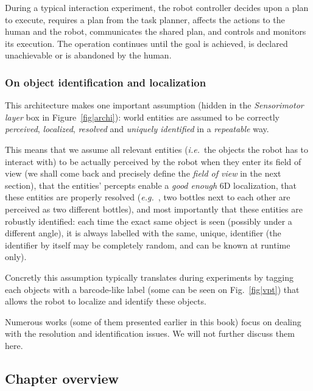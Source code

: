 \documentclass{svmult}
\newcommand{\ie}{{\textit{i.e.~}}}
\newcommand{\eg}{{\textit{e.g.~}}}
\begin{document}
During a typical interaction experiment, the robot controller decides upon a
plan to execute, requires a plan from the task planner, affects the actions to
the human and the robot, communicates the shared plan, and controls and
monitors its execution. The operation continues until the goal is achieved, is
declared unachievable or is abandoned by the human.



\subsubsection*{On object identification and localization}

This architecture makes one important assumption (hidden in the
\emph{Sensorimotor layer} box in Figure~\ref{fig|archi}): world entities are
assumed to be correctly \emph{perceived}, \emph{localized}, \emph{resolved} and
\emph{uniquely identified} in a \emph{repeatable} way.

This means that we assume all relevant entities (\ie the objects the robot has
to interact with) to be actually perceived by the robot when they enter its
field of view (we shall come back and precisely define the \emph{field of view}
in the next section), that the entities' percepts enable a \emph{good enough}
6D localization, that these entities are properly resolved (\eg, two bottles
next to each other are perceived as two different bottles), and most
importantly that these entities are robustly identified: each time the exact
same object is seen (possibly under a different angle), it is always labelled
with the same, unique, identifier (the identifier by itself may be completely
random, and can be known at runtime only).

Concretly this assumption typically translates during experiments by tagging
each objects with a barcode-like label (some can be seen on Fig.~\ref{fig|vpt})
that allows the robot to localize and identify these objects.

Numerous works  (some of them presented earlier in
this book) focus on dealing with the resolution and identification issues.  We
will not further discuss them here.



\subsection{Chapter overview}
\end{document}
